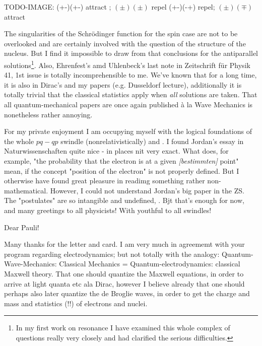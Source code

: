 \documentclass{article}
\begin{document}
TODO-IMAGE:
(+-)(+-) attract ; $(\pm)(\pm)$ repel
(+-)(-+) repel; $(\pm)(\mp)$ attract

The singularities of the Schr\"odinger function for the spin case are not to be overlooked and are certainly involved with the question of the structure of the nucleus. But I find it impossible to draw from that conclusions for the antiparallel solutions\footnote{In my first work on resonance I have examined this whole complex of questions really very closely and had clarified the serious difficulties.}. Also, Ehrenfest's amd Uhlenbeck's last note in Zeitschrift f\"ur Physik 41, 1st issue is totally incomprehensible to me. We've known that for a long time, it is also in Dirac's and my papers (e.g. Dusseldorf lecture), additionally it is totally trivial that the classical statistics apply when \textit{all} solutions are taken. That all quantum-mechanical papers are once again published \`a la Wave Mechanics is nonetheless rather annoying.

For my private enjoyment I am occupying myself with the logical foundations of the whole $pq-qp$ swindle (nonrelativistically) and . I found Jordan's essay in Naturwissenschaften quite nice - in places nit very exact. What does, for example, "the probability that the electron is at a given \textit{[bestimmten]} point" mean, if the concept "position of the electron" is not properly defined. But I otherwise have found great pleasure in readimg something rather non-mathematical. However, I could not understand Jordan's big paper in the ZS. The "postulates" are so intangible and undefined, . Bjt that's enough for now, and many greetings to all physicists! With youthful  to all  swindles!

\date{February 23, 1927}

Dear Pauli!

Many thanks for the letter and card. I am very much in agreememt with your program regarding electrodynamics; but not totally with the analogy: Quantum-Wave-Mechanics: Classical Mechanics = Quantum-electrodynamics: classical Maxwell theory. That one should quantize the Maxwell equations, in order to arrive at light quanta etc ala Dirac, however I believe already that one should perhaps also later quantize the de Broglie waves, in order to get the charge and mass and statistics (!!) of electrons and nuclei.
\end{document}
